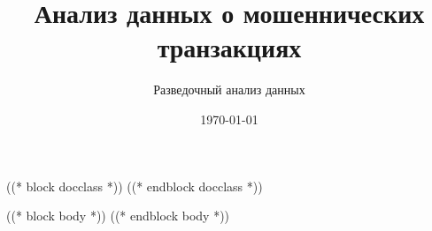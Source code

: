 \documentclass[11pt]{article}
\title{\textbf{Анализ данных о мошеннических транзакциях}}
\author{Разведочный анализ данных}
\date{\today}
\begin{document}
\maketitle

((* block docclass *))
((* endblock docclass *))

((* block body *))
((* endblock body *))
\end{document}
